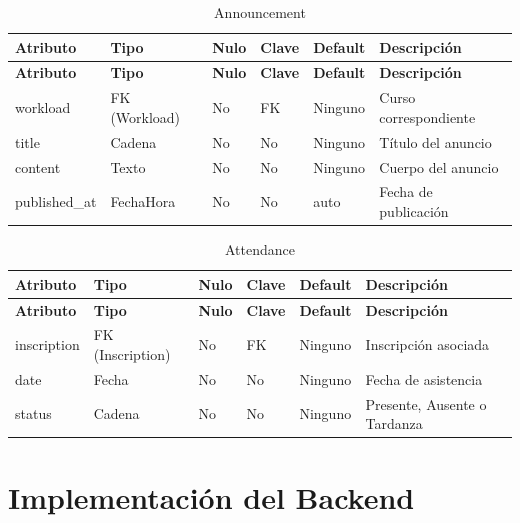 \documentclass{article}
\begin{document}
\begin{longtable}{|l|l|l|l|l|l|}
\caption{Announcement} \\
\hline
\rowcolor{tabledictionariesbackground}
\textbf{Atributo} & \textbf{Tipo} & \textbf{Nulo} & \textbf{Clave} & \textbf{Default} & \textbf{Descripción} \\
\hline
\endfirsthead
\hline
\rowcolor{tabledictionariesbackground}
\textbf{Atributo} & \textbf{Tipo} & \textbf{Nulo} & \textbf{Clave} & \textbf{Default} & \textbf{Descripción} \\
\hline
\endhead
workload & FK (Workload) & No & FK & Ninguno & Curso correspondiente \\
title & Cadena & No & No & Ninguno & Título del anuncio \\
content & Texto & No & No & Ninguno & Cuerpo del anuncio \\
published\_at & FechaHora & No & No & auto & Fecha de publicación \\
\hline
\end{longtable}

\begin{longtable}{|l|l|l|l|l|l|}
\caption{Attendance} \\
\hline
\rowcolor{tabledictionariesbackground}
\textbf{Atributo} & \textbf{Tipo} & \textbf{Nulo} & \textbf{Clave} & \textbf{Default} & \textbf{Descripción} \\
\hline
\endfirsthead
\hline
\rowcolor{tabledictionariesbackground}
\textbf{Atributo} & \textbf{Tipo} & \textbf{Nulo} & \textbf{Clave} & \textbf{Default} & \textbf{Descripción} \\
\hline
\endhead
inscription & FK (Inscription) & No & FK & Ninguno & Inscripción asociada \\
date & Fecha & No & No & Ninguno & Fecha de asistencia \\
status & Cadena & No & No & Ninguno & Presente, Ausente o Tardanza \\
\hline
\end{longtable}




\section{Implementación del Backend}
\end{document}
